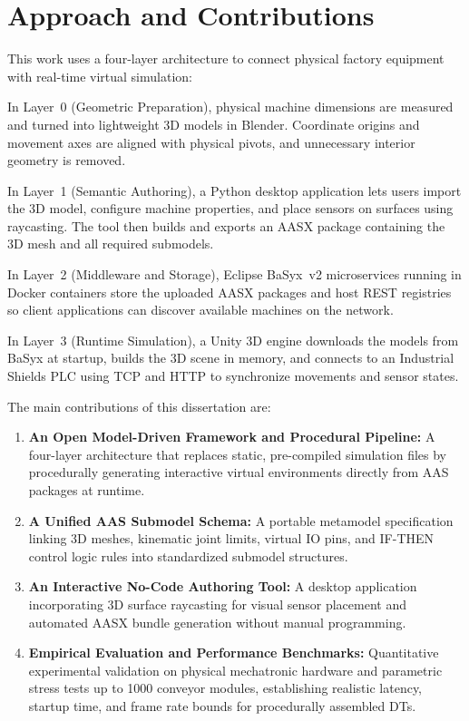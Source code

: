 \section{Approach and Contributions}
\label{sec:approach}

This work uses a four-layer architecture to connect physical factory equipment with real-time virtual simulation:

In Layer~0 (Geometric Preparation), physical machine dimensions are measured and turned into lightweight 3D models in Blender. Coordinate origins and movement axes are aligned with physical pivots, and unnecessary interior geometry is removed.

In Layer~1 (Semantic Authoring), a Python desktop application lets users import the 3D model, configure machine properties, and place sensors on surfaces using raycasting. The tool then builds and exports an \gls{AASX} package containing the 3D mesh and all required submodels.

In Layer~2 (Middleware and Storage), Eclipse BaSyx~v2 microservices running in Docker containers store the uploaded \gls{AASX} packages and host \gls{REST} registries so client applications can discover available machines on the network.

In Layer~3 (Runtime Simulation), a Unity 3D engine downloads the models from BaSyx at startup, builds the 3D scene in memory, and connects to an Industrial Shields \gls{PLC} using \gls{TCP} and \gls{HTTP} to synchronize movements and sensor states.

The main contributions of this dissertation are:
\begin{enumerate}
    \item \textbf{An Open Model-Driven Framework and Procedural Pipeline:} A four-layer architecture that replaces static, pre-compiled simulation files by procedurally generating interactive virtual environments directly from \gls{AAS} packages at runtime.
    \item \textbf{A Unified \gls{AAS} Submodel Schema:} A portable metamodel specification linking 3D meshes, kinematic joint limits, virtual \gls{IO} pins, and IF-THEN control logic rules into standardized submodel structures.
    \item \textbf{An Interactive No-Code Authoring Tool:} A desktop application incorporating 3D surface raycasting for visual sensor placement and automated \gls{AASX} bundle generation without manual programming.
    \item \textbf{Empirical Evaluation and Performance Benchmarks:} Quantitative experimental validation on physical mechatronic hardware and parametric stress tests up to 1000 conveyor modules, establishing realistic latency, startup time, and frame rate bounds for procedurally assembled \glspl{DT}.
\end{enumerate}

